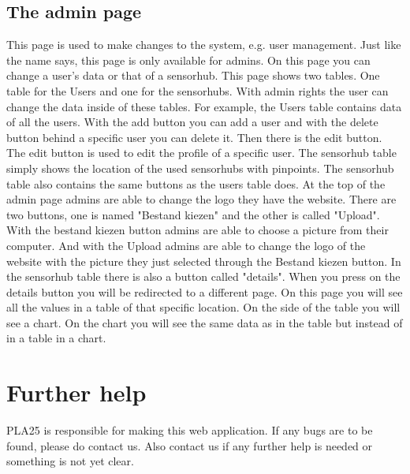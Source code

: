\documentclass[a4paper]{article}
\begin{document}
\subsection{The admin page}
This page is used to make changes to the system, e.g. user management. Just like the name says, this page is only available for admins. On this page you can change a user's data or that of a sensorhub.
\newline
\newline
This page shows two tables. One table for the Users and one for the sensorhubs. With admin rights the user can change the data inside of these tables.
\newline
\newline
For example, the Users table contains data of all the users. With the add button you can add a user and with the delete button behind a specific user you can delete it. Then there is the edit button. The edit button is used to edit the profile of a specific user.
\newline
\newline
The sensorhub table simply shows the location of the used sensorhubs with pinpoints. The sensorhub table also contains the same buttons as the users table does.
\newline
\newline
At the top of the admin page admins are able to change the logo they have the website. There are two buttons, one is named "Bestand kiezen" and the other is called "Upload".  With the bestand kiezen button admins are able to choose a picture from their computer. And with the Upload admins are able to change the logo of the website with the picture they just selected through the Bestand kiezen button.
\newline
\newline
In the sensorhub table there is also a button called "details". When you press on the details button you will be redirected to a different page. On this page you will see all the values in a table of that specific location. On the side of the table you will see a chart. On the chart you will see the same data as in the table but instead of in a table in a chart.

\newpage
\section{Further help}
PLA25 is responsible for making this web application. If any bugs are to be found, please do contact us.
Also contact us if any further help is needed or something is not yet clear.
\end{document}
